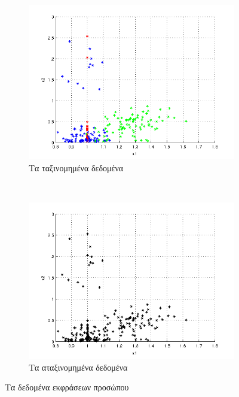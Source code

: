 \documentclass{assignment}
\begin{document}
\begin{figure}[htbp]
  \centering
  \begin{subfigure}[b]{0.5\textwidth}
     \includegraphics[width=\textwidth,height=0.25\textheight]{matlab/labeled_data_points.png}
  \caption{Τα ταξινομημένα δεδομένα}
  \end{subfigure}%
   ~ %
  \begin{subfigure}[b]{0.5\textwidth}
    \includegraphics[width=\textwidth,height=0.25\textheight]{matlab/unlabeled_data_points.png}
  \caption{Τα αταξινομημένα δεδομένα}
  \end{subfigure}

  \caption{Τα δεδομένα εκφράσεων προσώπου}
\label{fig:data_points}
\end{figure}
\end{document}
